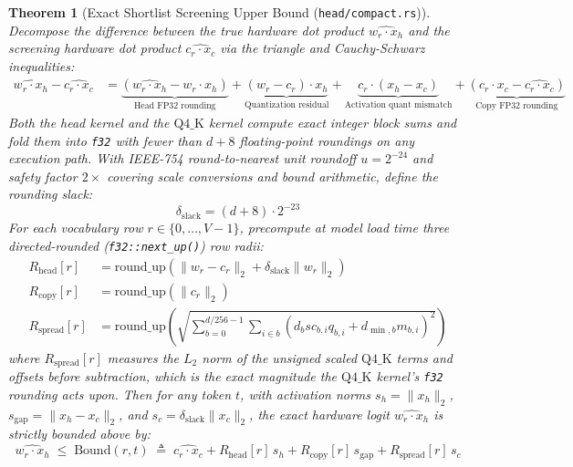 \documentclass[10pt,a4paper]{article}
\theoremstyle{swzstyle}
\newtheorem{theorem}{Theorem}[section]
\newcommand{\code}[1]{\texttt{#1}}
\begin{document}
\begin{theorem}[Exact Shortlist Screening Upper Bound (\texttt{head/compact.rs})]
Decompose the difference between the true hardware dot product $\widehat{w_r \cdot x_h}$ and the screening hardware dot product $\widehat{c_r \cdot x_c}$ via the triangle and Cauchy-Schwarz inequalities:
\begin{align}
  \widehat{w_r \cdot x_h} - \widehat{c_r \cdot x_c}
  &= \underbrace{\left(\widehat{w_r \cdot x_h} - w_r \cdot x_h\right)}_{\text{Head FP32 rounding}}
   + \underbrace{(w_r - c_r) \cdot x_h}_{\text{Quantization residual}}
   + \underbrace{c_r \cdot (x_h - x_c)}_{\text{Activation quant mismatch}}
   + \underbrace{\left(c_r \cdot x_c - \widehat{c_r \cdot x_c}\right)}_{\text{Copy FP32 rounding}}
\end{align}
Both the head kernel and the $\text{Q4\_K}$ kernel compute exact integer block sums and fold them into \code{f32} with fewer than $d + 8$ floating-point roundings on any execution path. With IEEE-754 round-to-nearest unit roundoff $u = 2^{-24}$ and safety factor $2\times$ covering scale conversions and bound arithmetic, define the rounding slack:
\begin{equation}
  \delta_{\text{slack}} = (d + 8) \cdot 2^{-23}
\end{equation}
For each vocabulary row $r \in \{0, \dots, V-1\}$, precompute at model load time three directed-rounded (\code{f32::next\_up()}) row radii:
\begin{align}
  R_{\text{head}}[r] &= \text{round\_up}\!\left(\|w_r - c_r\|_2 + \delta_{\text{slack}} \|w_r\|_2\right) \\
  R_{\text{copy}}[r] &= \text{round\_up}\!\left(\|c_r\|_2\right) \\
  R_{\text{spread}}[r] &= \text{round\_up}\!\left(\sqrt{\sum_{b=0}^{d/256 - 1} \sum_{i \in b} \left(d_b sc_{b,i} q_{b,i} + d_{\min,b} m_{b,i}\right)^2}\right)
\end{align}
where $R_{\text{spread}}[r]$ measures the $L_2$ norm of the unsigned scaled $\text{Q4\_K}$ terms and offsets before subtraction, which is the exact magnitude the $\text{Q4\_K}$ kernel's \code{f32} rounding acts upon. Then for any token $t$, with activation norms $s_h = \|x_h\|_2$, $s_{\text{gap}} = \|x_h - x_c\|_2$, and $s_c = \delta_{\text{slack}} \|x_c\|_2$, the exact hardware logit $\widehat{w_r \cdot x_h}$ is strictly bounded above by:
\begin{equation}
  \widehat{w_r \cdot x_h} \;\le\; \text{Bound}(r, t) \;\triangleq\; \widehat{c_r \cdot x_c} + R_{\text{head}}[r]\, s_h + R_{\text{copy}}[r]\, s_{\text{gap}} + R_{\text{spread}}[r]\, s_c
  \label{eq:shortlist_bound}
\end{equation}
\end{theorem}
\end{document}
